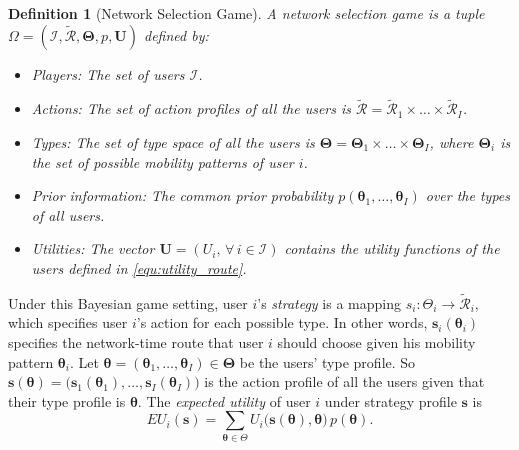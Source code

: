 \documentclass[journal]{IEEEtran}
\newcommand{\mc}[1]{\mathcal{#1}}
\newcommand{\bs}[1]{\boldsymbol{#1}}
\newtheorem{definition}{Definition}
\begin{document}
\begin{definition}[Network Selection Game] %
  A network selection game is a tuple $\Omega = (\mathcal{I}, \tilde{\mathcal{R}}, \boldsymbol{\Theta}, p, \boldsymbol{U})$ defined by:

\begin{itemize}
	\item Players: The set of users $\mathcal{I}$.
	
	\item Actions: The set of action profiles of all the users is $\tilde{\mathcal{R}} = \tilde{\mathcal{R}}_1 \times \ldots \times \tilde{\mathcal{R}}_I$. %
	
	\item Types: The set of type space of all the users is $\boldsymbol{\Theta} = \boldsymbol{\Theta}_1 \times \ldots \times \boldsymbol{\Theta}_I$, where $\boldsymbol{\Theta}_i$ is the set of possible mobility patterns of user $i$.
	
	\item Prior information: The common prior probability $p(\boldsymbol{\theta}_1,\dots,\boldsymbol{\theta}_I)$ over the types of all users.  %
	
	\item Utilities: The vector $\boldsymbol{U} = (U_i, \, \forall \, i \in \mathcal{I})$ contains the utility functions of the users defined in \eqref{equ:utility_route}.
	
\end{itemize}
\end{definition}



  Under this Bayesian game setting, user $i$'s \emph{strategy} is a mapping $s_i: \Theta_i \rightarrow \tilde{\mathcal{R}}_i$, which specifies user $i$'s action for each possible type. %
	In other words, $\bs{s}_i(\bs{\theta}_i)$ specifies the network-time route that user $i$ should choose given his mobility pattern $\bs{\theta}_i$.
	Let $\boldsymbol{\theta} = (\boldsymbol{\theta}_1,\dots,\boldsymbol{\theta}_I) \in \boldsymbol{\Theta}$ be the users' type profile.
	So $\bs{s}(\bs{\theta}) = \bigl( \bs{s}_1(\bs{\theta}_1), \ldots, \bs{s}_I(\bs{\theta}_I) \bigr)$ is the action profile of all the users given that their type profile is $\bs{\theta}$.
	The \emph{expected utility} of user $i$ under strategy profile $\boldsymbol{s}$ is
%
\begin{equation} \label{equ:expectedutility} 
	EU_i(\boldsymbol{s}) = \sum_{\boldsymbol{\theta} \in \Theta} U_i \bigl( \boldsymbol{s}(\boldsymbol{\theta}), \boldsymbol{\theta} \bigr) \, p(\boldsymbol{\theta}).
\end{equation}
%			
\end{document}
